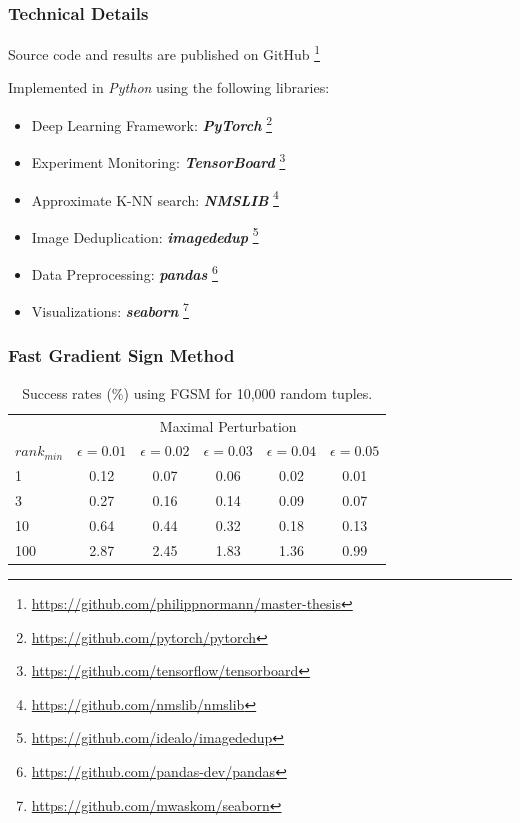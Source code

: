 \documentclass{beamer}
\begin{document}
	\begin{frame}
		\frametitle{Technical Details}
		Source code and results are published on GitHub \footnote{\url{https://github.com/philippnormann/master-thesis}}
		
		Implemented in \textit{Python} using the following libraries:
		\begin{itemize}
			\item Deep Learning Framework: \textbf{\textit{PyTorch}} \footnote{\url{https://github.com/pytorch/pytorch}}
			\item Experiment Monitoring: \textbf{\textit{TensorBoard}} \footnote{\url{https://github.com/tensorflow/tensorboard}}
			\item Approximate K-NN search: \textbf{\textit{NMSLIB}} \footnote{\url{https://github.com/nmslib/nmslib}}
			\item Image Deduplication: \textbf{\textit{imagededup}} \footnote{\url{https://github.com/idealo/imagededup}}
			\item Data Preprocessing: \textbf{\textit{pandas}} \footnote{\url{https://github.com/pandas-dev/pandas}}
			\item Visualizations: \textbf{\textit{seaborn}} \footnote{\url{https://github.com/mwaskom/seaborn}}
		\end{itemize}
	\end{frame}
	
	\begin{frame}
		\frametitle{Fast Gradient Sign Method}
		\begin{table}[H]
			\centering
			\begin{tabular}{ lccccc } 
				\toprule		
				& \multicolumn{5}{c}{Maximal Perturbation} \\
				\cmidrule{2-6}
				$rank_{min}$ & $\epsilon = 0.01$ & $\epsilon = 0.02$ & $\epsilon = 0.03$  & $\epsilon = 0.04$ & $\epsilon = 0.05$  \\
				\midrule
				1 & 0.12 & 0.07 & 0.06 & 0.02 & 0.01 \\
				3 & 0.27 & 0.16 & 0.14 & 0.09 & 0.07 \\
				10 & 0.64 & 0.44 & 0.32 & 0.18 & 0.13 \\
				100 & 2.87 & 2.45 & 1.83 & 1.36 & 0.99 \\
				\bottomrule
			\end{tabular}
			\caption{Success rates (\%) using FGSM for 10,000 random tuples.}
			\label{tab:fgsm-results}
		\end{table}
	\end{frame}
	
\end{document}
